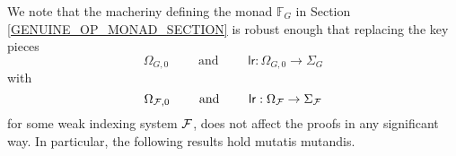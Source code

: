 \documentclass[a4paper,10pt]{article}%
\begin{document}
\begin{remark}
\end{remark}








We note that the macheriny defining the monad $\mathbb F_G$ in Section \ref{GENUINE_OP_MONAD_SECTION} is robust enough that replacing the key pieces 
\[
\Omega_{G,0} \qquad \mbox{ and } \qquad \mathsf{lr}: \Omega_{G,0} \to \Sigma_G
\]
with 
\[
\Omega_{\mathcal F,0} \qquad \mbox{ and } \qquad \mathsf{lr}: \Omega_{\mathcal F} \to \Sigma_{\mathcal F}
\]
for some weak indexing system $\mathcal F$, does not affect the proofs in any significant way. 
In particular, the following results hold mutatis mutandis.
\end{document}
